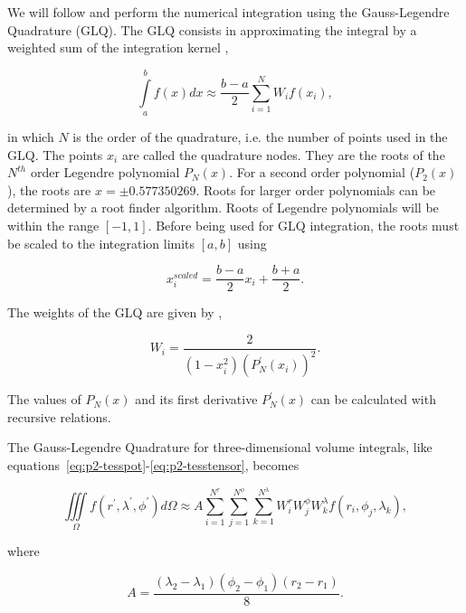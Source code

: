 We will follow \citet{asgharzadeh2007} and perform the numerical integration
using the Gauss-Legendre Quadrature (GLQ).
The GLQ consists in approximating the integral by a weighted sum of the
integration kernel \citep{hildebrand1987},

\begin{equation}
    \int\limits_a^b f(x) dx \approx
    \frac{b-a}{2}\sum\limits_{i=1}^N W_i f(x_i),
    \label{eq:p2-glq1d}
\end{equation}

\noindent
in which $N$ is the order of the quadrature,
i.e. the number of points used in the GLQ.
The points $x_i$ are called the quadrature nodes.
They are the roots of the $N^{th}$ order Legendre polynomial $P_N(x)$.
For a second order polynomial ($P_2(x)$),
the roots are $x = \pm 0.577350269$.
Roots for larger order polynomials
can be determined by a root finder algorithm.
Roots of Legendre polynomials
will be within the range $[-1, 1]$.
Before being used for GLQ integration,
the roots must be scaled to the integration limits $[a, b]$ using

\begin{equation}
    x^{scaled}_i = \frac{b - a}{2} x_i + \frac{b + a}{2}.
    \label{eq:p2-glq_scaling}
\end{equation}

The weights of the GLQ are given by \citep{hildebrand1987},

\begin{equation}
    W_i = \frac{2}{(1 - x_i^2)(P^\prime_N(x_i))^2}.
    \label{eq:p2-glq_weights}
\end{equation}

\noindent
The values of $P_N(x)$ and its first derivative $P^\prime_N(x)$
can be calculated with recursive relations.

The Gauss-Legendre Quadrature for three-dimensional volume integrals,
like equations~\ref{eq:p2-tesspot}-\ref{eq:p2-tesstensor},
becomes \citep{asgharzadeh2007}

\begin{equation}
    \iiint\limits_{\Omega}
    f(r^\prime, \lambda^\prime, \phi^\prime)
    d\Omega
    \approx
    A
    \sum\limits_{i=1}^{N^r}
    \sum\limits_{j=1}^{N^\phi}
    \sum\limits_{k=1}^{N^\lambda}
    W_i^r W_j^\phi W_k^\lambda
    f(r_i, \phi_j, \lambda_k),
    \label{eq:p2-glq3d}
\end{equation}

\noindent
where

\begin{equation}
    A = \frac{(\lambda_2 - \lambda_1)(\phi_2 - \phi_1)(r_2 - r_1)}{8}.
\end{equation}

